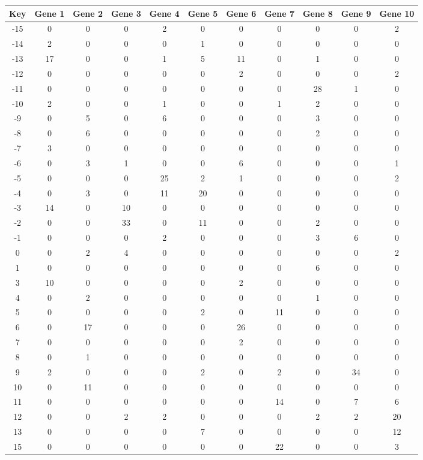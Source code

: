 \begin{tabular}{|c|c|c|c|c|c|c|c|c|c|c|}
\hline
Key & Gene 1 & Gene 2 & Gene 3 & Gene 4 & Gene 5 & Gene 6 & Gene 7 & Gene 8 & Gene 9 & Gene 10 \\
\hline
-15 & 0 & 0 & 0 & 2 & 0 & 0 & 0 & 0 & 0 & 2 \\
-14 & 2 & 0 & 0 & 0 & 1 & 0 & 0 & 0 & 0 & 0 \\
-13 & 17 & 0 & 0 & 1 & 5 & 11 & 0 & 1 & 0 & 0 \\
-12 & 0 & 0 & 0 & 0 & 0 & 2 & 0 & 0 & 0 & 2 \\
-11 & 0 & 0 & 0 & 0 & 0 & 0 & 0 & 28 & 1 & 0 \\
-10 & 2 & 0 & 0 & 1 & 0 & 0 & 1 & 2 & 0 & 0 \\
-9 & 0 & 5 & 0 & 6 & 0 & 0 & 0 & 3 & 0 & 0 \\
-8 & 0 & 6 & 0 & 0 & 0 & 0 & 0 & 2 & 0 & 0 \\
-7 & 3 & 0 & 0 & 0 & 0 & 0 & 0 & 0 & 0 & 0 \\
-6 & 0 & 3 & 1 & 0 & 0 & 6 & 0 & 0 & 0 & 1 \\
-5 & 0 & 0 & 0 & 25 & 2 & 1 & 0 & 0 & 0 & 2 \\
-4 & 0 & 3 & 0 & 11 & 20 & 0 & 0 & 0 & 0 & 0 \\
-3 & 14 & 0 & 10 & 0 & 0 & 0 & 0 & 0 & 0 & 0 \\
-2 & 0 & 0 & 33 & 0 & 11 & 0 & 0 & 2 & 0 & 0 \\
-1 & 0 & 0 & 0 & 2 & 0 & 0 & 0 & 3 & 6 & 0 \\
0 & 0 & 2 & 4 & 0 & 0 & 0 & 0 & 0 & 0 & 2 \\
1 & 0 & 0 & 0 & 0 & 0 & 0 & 0 & 6 & 0 & 0 \\
3 & 10 & 0 & 0 & 0 & 0 & 2 & 0 & 0 & 0 & 0 \\
4 & 0 & 2 & 0 & 0 & 0 & 0 & 0 & 1 & 0 & 0 \\
5 & 0 & 0 & 0 & 0 & 2 & 0 & 11 & 0 & 0 & 0 \\
6 & 0 & 17 & 0 & 0 & 0 & 26 & 0 & 0 & 0 & 0 \\
7 & 0 & 0 & 0 & 0 & 0 & 2 & 0 & 0 & 0 & 0 \\
8 & 0 & 1 & 0 & 0 & 0 & 0 & 0 & 0 & 0 & 0 \\
9 & 2 & 0 & 0 & 0 & 2 & 0 & 2 & 0 & 34 & 0 \\
10 & 0 & 11 & 0 & 0 & 0 & 0 & 0 & 0 & 0 & 0 \\
11 & 0 & 0 & 0 & 0 & 0 & 0 & 14 & 0 & 7 & 6 \\
12 & 0 & 0 & 2 & 2 & 0 & 0 & 0 & 2 & 2 & 20 \\
13 & 0 & 0 & 0 & 0 & 7 & 0 & 0 & 0 & 0 & 12 \\
15 & 0 & 0 & 0 & 0 & 0 & 0 & 22 & 0 & 0 & 3 \\
\hline
\end{tabular}